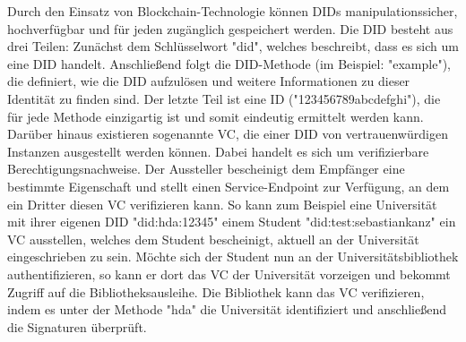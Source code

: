 Durch den Einsatz von Blockchain-Technologie können \ac{DID}s manipulationssicher, hochverfügbar und für jeden zugänglich gespeichert werden. Die \ac{DID} besteht aus drei Teilen: Zunächst dem Schlüsselwort "did", welches beschreibt, dass es sich um eine \ac{DID} handelt. Anschließend folgt die DID-Methode (im Beispiel: "example"), die definiert, wie die \ac{DID} aufzulösen und weitere Informationen zu dieser Identität zu finden sind. Der letzte Teil ist eine ID ("123456789abcdefghi"), die für jede Methode einzigartig ist und somit eindeutig ermittelt werden kann.\\
Darüber hinaus existieren sogenannte \ac{VC}, die einer \ac{DID} von vertrauenwürdigen Instanzen ausgestellt werden können. Dabei handelt es sich um verifizierbare Berechtigungsnachweise. Der Aussteller bescheinigt dem Empfänger eine bestimmte Eigenschaft und stellt einen Service-Endpoint zur Verfügung, an dem ein Dritter diesen \ac{VC} verifizieren kann. So kann zum Beispiel eine Universität mit ihrer eigenen \ac{DID} "did:hda:12345" einem Student "did:test:sebastiankanz" ein \ac{VC} ausstellen, welches dem Student bescheinigt, aktuell an der Universität eingeschrieben zu sein. Möchte sich der Student nun an der Universitätsbibliothek authentifizieren, so kann er dort das \ac{VC} der Universität vorzeigen und bekommt Zugriff auf die Bibliotheksausleihe. Die Bibliothek kann das \ac{VC} verifizieren, indem es unter der Methode "hda" die Universität identifiziert und anschließend die Signaturen überprüft.

